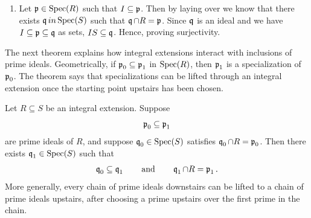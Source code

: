 \documentclass[Notebook.tex]{subfiles}
\begin{document}
\begin{solution}
\begin{enumerate}
        \item Let $\operatorname{\mathfrak{p}} \in \operatorname{Spec}(R)$ such that $I \subseteq \operatorname{\mathfrak{p}}$. Then by laying over we know that there exists $\operatorname{\mathfrak{q}} in \operatorname{Spec}(S)$ such that $\operatorname{\mathfrak{q}} \cap R = \operatorname{\mathfrak{p}}$. Since $\operatorname{\mathfrak{q}}$ is an ideal and we have $I \subseteq \operatorname{\mathfrak{p}} \subseteq \operatorname{\mathfrak{q}}$ as sets, $IS \subseteq \operatorname{\mathfrak{q}}$. Hence, proving surjectivity. 
        
        
        
        
    \end{enumerate}
\end{solution}

\newpage 

\hrulefill

The next theorem explains how integral extensions interact with inclusions of prime ideals. Geometrically, if $\operatorname{\mathfrak{p}}_0\subseteq \operatorname{\mathfrak{p}}_1$ in $\operatorname{Spec}(R)$, then $\operatorname{\mathfrak{p}}_1$ is a specialization of $\operatorname{\mathfrak{p}}_0$. The theorem says that specializations can be lifted through an integral extension once the starting point upstairs has been chosen.

\begin{theorem}[Going Up]
Let $R\subseteq S$ be an integral extension. Suppose
\[
\operatorname{\mathfrak{p}}_0\subseteq \operatorname{\mathfrak{p}}_1
\]
are prime ideals of $R$, and suppose $\operatorname{\mathfrak{q}}_0\in\operatorname{Spec}(S)$ satisfies $\operatorname{\mathfrak{q}}_0\cap R=\operatorname{\mathfrak{p}}_0$. Then there exists $\operatorname{\mathfrak{q}}_1\in\operatorname{Spec}(S)$ such that
\[
\operatorname{\mathfrak{q}}_0\subseteq \operatorname{\mathfrak{q}}_1
\qquad\text{and}\qquad
\operatorname{\mathfrak{q}}_1\cap R=\operatorname{\mathfrak{p}}_1.
\]
More generally, every chain of prime ideals downstairs can be lifted to a chain of prime ideals upstairs, after choosing a prime upstairs over the first prime in the chain.
\end{theorem}

\hrulefill

\newpage 
\end{document}

